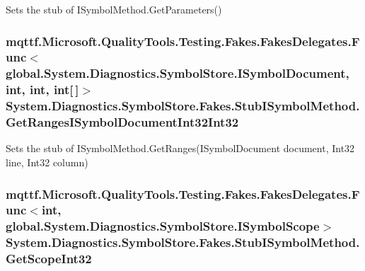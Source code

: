Sets the stub of I\-Symbol\-Method.\-Get\-Parameters()

\hypertarget{class_system_1_1_diagnostics_1_1_symbol_store_1_1_fakes_1_1_stub_i_symbol_method_a6f035ca37cfb1e055d3d374e76e77eb7}{
\subsubsection[{Get\-Ranges\-I\-Symbol\-Document\-Int32\-Int32}]{\setlength{\rightskip}{0pt plus 5cm}mqttf.\-Microsoft.\-Quality\-Tools.\-Testing.\-Fakes.\-Fakes\-Delegates.\-Func$<$global.\-System.\-Diagnostics.\-Symbol\-Store.\-I\-Symbol\-Document, int, int, int\mbox{[}$\,$\mbox{]}$>$ System.\-Diagnostics.\-Symbol\-Store.\-Fakes.\-Stub\-I\-Symbol\-Method.\-Get\-Ranges\-I\-Symbol\-Document\-Int32\-Int32}}\label{class_system_1_1_diagnostics_1_1_symbol_store_1_1_fakes_1_1_stub_i_symbol_method_a6f035ca37cfb1e055d3d374e76e77eb7}


Sets the stub of I\-Symbol\-Method.\-Get\-Ranges(\-I\-Symbol\-Document document, Int32 line, Int32 column)

\hypertarget{class_system_1_1_diagnostics_1_1_symbol_store_1_1_fakes_1_1_stub_i_symbol_method_a06d6ec419f665b4436ff10d982e67dc6}{
\subsubsection[{Get\-Scope\-Int32}]{\setlength{\rightskip}{0pt plus 5cm}mqttf.\-Microsoft.\-Quality\-Tools.\-Testing.\-Fakes.\-Fakes\-Delegates.\-Func$<$int, global.\-System.\-Diagnostics.\-Symbol\-Store.\-I\-Symbol\-Scope$>$ System.\-Diagnostics.\-Symbol\-Store.\-Fakes.\-Stub\-I\-Symbol\-Method.\-Get\-Scope\-Int32}}\label{class_system_1_1_diagnostics_1_1_symbol_store_1_1_fakes_1_1_stub_i_symbol_method_a06d6ec419f665b4436ff10d982e67dc6}


